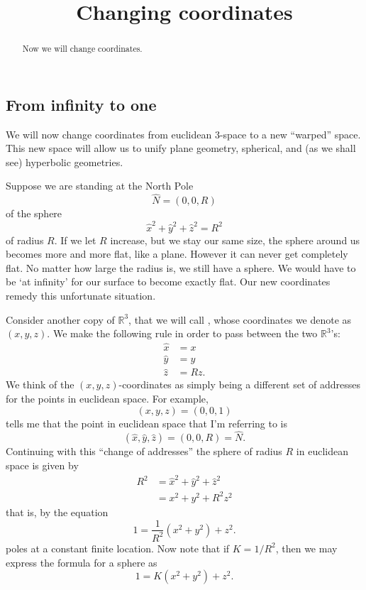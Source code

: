 \documentclass[newpage,hints,handout,12pt,noauthor,nooutcomes]{ximera}
\title{Changing coordinates}
\begin{document}
\begin{abstract}
Now we will change coordinates.
\end{abstract}
\maketitle


\subsection{From infinity to one}

We will now change coordinates from euclidean $3$-space to a new
``warped'' space.  This new space will allow us to unify plane
geometry, spherical, and (as we shall see) hyperbolic
geometries.


Suppose we are standing at the North Pole%
\[
\hat{N}=(0,0,R)
\]
of the sphere%
\[
\hat{x}^{2}+\hat{y}^{2}+\hat{z}^{2}=R^{2} %
\]
of radius $R$. If we let $R$ increase, but we stay our same size, the
sphere around us becomes more and more flat, like a plane. However it
can never get completely flat. No matter how large the radius is, we
still have a sphere.  We would have to be `at infinity' for our
surface to become exactly flat. Our new coordinates remedy this
unfortunate situation.


Consider another copy of $\mathbb{R}^{3}$, that we will call
, whose coordinates we denote as
$\left( x,y,z\right) $.  We make the following rule in order to pass
between the two $\mathbb{R}^{3}$'s:%
\begin{align*}
\hat{x}  &  =x\\
\hat{y}  &  =y\\
\hat{z}  &  =Rz.
\end{align*}
We think of the $\left( x,y,z\right) $-coordinates as simply being a
different set of addresses for the points in euclidean space. For
example,
\[
\left(x,y,z\right)  =\left(0,0,1\right)
\]
tells me that the point in euclidean space that I'm referring to is%
\[
\left(\hat{x},\hat{y},\hat{z}\right) =\left( 0,0,R\right)= \hat{N}.
\]
Continuing with this ``change of addresses'' the sphere of radius $R$
in euclidean space is given by
\begin{align*}
  R^{2} &=\hat{x}^{2}+\hat{y}^{2}+\hat{z}^{2}\\
  &=x^{2}+y^{2}+R^{2}z^{2}
\end{align*}
that is, by the equation
\[
1=\frac{1}{R^{2}}\left(  x^{2}+y^{2}\right)  +z^{2}. %
\]
poles at a constant finite location.  Now note that if $K=1/R^2$, then
we may express the formula for a sphere as
\[
1=K(x^{2}+y^{2})+z^{2}.
\]
\end{document}
